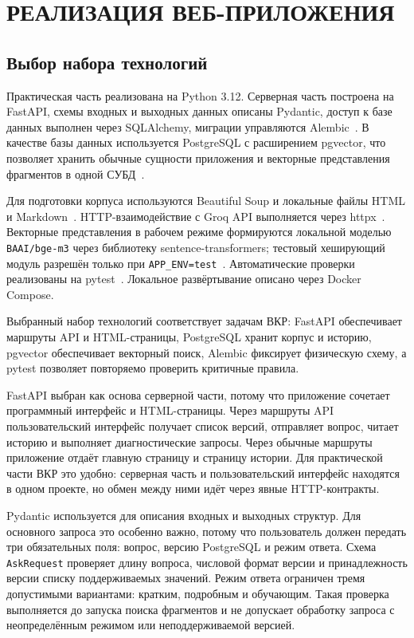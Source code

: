 \chapter{{\fontsize{14pt}{21pt}\selectfont\MakeUppercase{Реализация веб-приложения}}}
\label{cha:impl}

\section{Выбор набора технологий}

Практическая часть реализована на Python 3.12. Серверная часть построена на FastAPI, схемы входных и выходных данных описаны Pydantic, доступ к базе данных выполнен через SQLAlchemy, миграции управляются Alembic~\cite{python-docs,fastapi-docs,pydantic-docs,sqlalchemy-docs,alembic-docs}. В качестве базы данных используется PostgreSQL с расширением pgvector, что позволяет хранить обычные сущности приложения и векторные представления фрагментов в одной СУБД~\cite{postgres-docs,pgvector}.

Для подготовки корпуса используются Beautiful Soup и локальные файлы HTML и Markdown~\cite{beautifulsoup-docs}. HTTP-взаимодействие с Groq API выполняется через httpx~\cite{httpx-docs,groq-docs}. Векторные представления в рабочем режиме формируются локальной моделью \texttt{BAAI/bge-m3} через библиотеку sentence-transformers; тестовый хеширующий модуль разрешён только при \texttt{APP\_ENV=test}~\cite{sentence-transformers-docs}. Автоматические проверки реализованы на pytest~\cite{pytest-docs}. Локальное развёртывание описано через Docker Compose.

Выбранный набор технологий соответствует задачам ВКР: FastAPI обеспечивает маршруты API и HTML-страницы, PostgreSQL хранит корпус и историю, pgvector обеспечивает векторный поиск, Alembic фиксирует физическую схему, а pytest позволяет повторяемо проверить критичные правила.

FastAPI выбран как основа серверной части, потому что приложение сочетает программный интерфейс и HTML-страницы. Через маршруты API пользовательский интерфейс получает список версий, отправляет вопрос, читает историю и выполняет диагностические запросы. Через обычные маршруты приложение отдаёт главную страницу и страницу истории. Для практической части ВКР это удобно: серверная часть и пользовательский интерфейс находятся в одном проекте, но обмен между ними идёт через явные HTTP-контракты.

Pydantic используется для описания входных и выходных структур. Для основного запроса это особенно важно, потому что пользователь должен передать три обязательных поля: вопрос, версию PostgreSQL и режим ответа. Схема \texttt{AskRequest} проверяет длину вопроса, числовой формат версии и принадлежность версии списку поддерживаемых значений. Режим ответа ограничен тремя допустимыми вариантами: кратким, подробным и обучающим. Такая проверка выполняется до запуска поиска фрагментов и не допускает обработку запроса с неопределённым режимом или неподдерживаемой версией.

